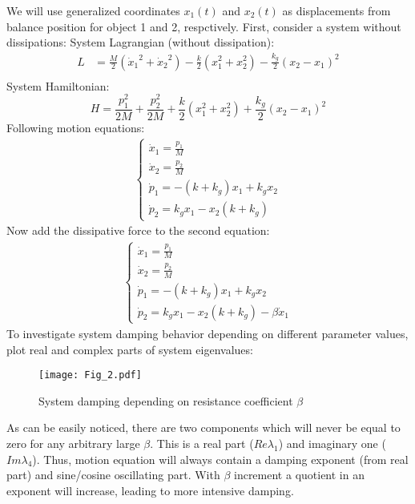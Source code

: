 \documentclass[%
aps, pra,
amsmath,amssymb,
reprint,%
superscriptaddress
]{revtex4-2}
\begin{document}
We will use generalized coordinates $x_1(t)$ and $x_2(t)$ as displacements from balance position for  object 1 and 2, respctively.\newline
First, consider a system without dissipations: 
System Lagrangian (without dissipation):\newline
\begin{align*}
L &= \frac{M}{2}\left({\dot x_1}^2 + {\dot x_2}^2\right) - \frac{k}{2}\left(x_1^2 + x_2^2\right) - \frac{k_g}{2}\left(x_2-x_1\right)^2\\
\end{align*}
System Hamiltonian:
\begin{equation}
H = \frac{p_1^2}{2M} + \frac{p_2^2}{2M} + \frac{k}{2}\left(x_1^2 + x_2^2\right) + \frac{k_g}{2}\left(x_2 - x_1\right)^2
\end{equation}
Following motion equations:\newline
\begin{align*}
	\begin{cases}
		\dot x_1 = \frac{p_1}{M}
		\\
		\dot x_2 = \frac{p_2}{M}
		\\
		\dot p_1 = -(k+k_g)x_1 + k_g x_2
		\\
		\dot p_2 = k_gx_1 - x_2(k+k_g)
	\end{cases}
\end{align*}
Now add the dissipative force to the second equation:
\begin{align*}
	\begin{cases}
		\dot x_1 = \frac{p_1}{M}
		\\
		\dot x_2 = \frac{p_2}{M}
		\\
		\dot p_1 = -(k+k_g)x_1 + k_g x_2
		\\
		\dot p_2 = k_gx_1 - x_2(k+k_g) - \beta \dot x_1
	\end{cases}
\end{align*}
To investigate system damping behavior depending on different parameter values, plot real and complex parts of system eigenvalues:
\begin{figure}[h]
	\centering
	\texttt{[image: Fig\_2.pdf]}
	\caption{System damping depending on resistance coefficient $\beta$}
\end{figure}\newline

As can be easily noticed, there are two components which will never be equal to zero for any arbitrary large $\beta$. This is a real part ($Re \lambda_1$) and imaginary one ($Im \lambda_4$). Thus, motion equation will always contain a damping exponent (from real part) and sine/cosine oscillating part. With $\beta$ increment a quotient in an exponent will increase, leading to more intensive damping.
\end{document}

